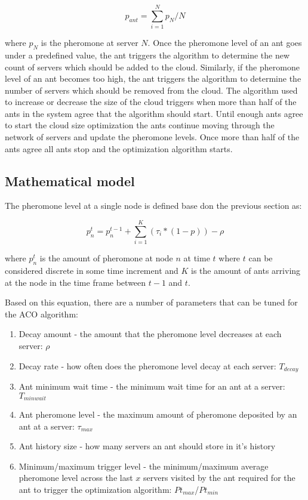 \documentclass[conference]{IEEEtran}
\begin{document}
\begin{equation}
p_{ant} = \sum_{i=1}^{N} p_{N} / N
\end{equation}

where $p_{N}$ is the pheromone at server $N$. Once the pheromone level of an ant goes under a predefined value, the ant triggers the algorithm to determine the new count of servers which should be added to the cloud. Similarly, if the pheromone level of an ant becomes too high, the ant triggers the algorithm to determine the number of servers which should be removed from the cloud. The algorithm used to increase or decrease the size of the cloud triggers when more than half of the ants in the system agree that the algorithm should start. Until enough ants agree to start the cloud size optimization the ants continue moving through the network of servers and update the pheromone levels. Once more than half of the ants agree all ants stop and the optimization algorithm starts.

\subsection{Mathematical model}

The pheromone level at a single node is defined base don the previous section as:

\begin{equation}
p^{t}_{n} = p^{t-1}_{n} + \sum_{i=1}^{K}(\tau_{i} * (1 - p)) - \rho
\end{equation}

where $p^{t}_{n}$ is the amount of pheromone at node $n$ at time $t$ where $t$ can be considered discrete in some time increment and $K$ is the amount of ants arriving at the node in the time frame between $t-1$ and $t$.

Based on this equation, there are a number of parameters that can be tuned for the ACO algorithm:

\begin{enumerate}
	\item Decay amount - the amount that the pheromone level decreases at each server: $\rho$
	\item Decay rate - how often does the pheromone level decay at each server: $T_{decay}$
	\item Ant minimum wait time - the minimum wait time for an ant at a server: $T_{minwait}$
	\item Ant pheromone level - the maximum amount of pheromone deposited by an ant at a server: $\tau_{max}$
	\item Ant history size - how many servers an ant should store in it's history
	\item Minimum/maximum trigger level - the minimum/maximum average pheromone level across the last $x$ servers visited by the ant required for the ant to trigger the optimization algorithm: $Pt_{max}$/$Pt_{min}$
\end{enumerate}
\end{document}
